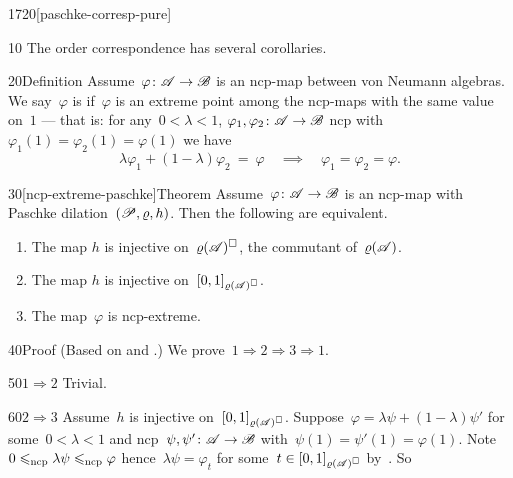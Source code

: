 \begin{parsec}{1720}[paschke-corresp-pure]%
\begin{point}{10}%
The order correspondence 
    has several corollaries.
\end{point}
\begin{point}{20}{Definition}%
Assume~$\varphi\colon \mathscr{A} \to \mathscr{B}$ is an ncp-map between von Neumann
    algebras.
We say~$\varphi$ is 
    if~$\varphi$ is an extreme point among
    the ncp-maps with the same value on~$1$ ---
    that is:
    for any~$0 < \lambda < 1$, $\varphi_1,\varphi_2\colon \mathscr{A} \to \mathscr{B}$
    ncp with~$\varphi_1(1) = \varphi_2(1) = \varphi(1)$
    we have
    \begin{equation*}
    \lambda \varphi_1 + (1-\lambda)\varphi_2 \ =\  \varphi
    \quad \implies \quad
    \varphi_1=\varphi_2=\varphi.
    \end{equation*}
\end{point}
\begin{point}{30}[ncp-extreme-paschke]{Theorem}%
Assume~$\varphi\colon \mathscr{A} \to \mathscr{B}$ is an ncp-map
    with Paschke dilation~$(\mathscr{P}, \varrho, h)$.
Then the following are equivalent.
\begin{enumerate}
    \item The map $h$ is injective on~$\varrho(\mathscr{A})^\square$,
                the commutant of~$\varrho(\mathscr{A})$.
    \item The map $h$ is injective on~$[0,1]_{\varrho(\mathscr{A})^\square}$.
    \item The map~$\varphi$ is ncp-extreme.
\end{enumerate}
\begin{point}{40}{Proof}%
(Based on \cite[Prop.~1.4.6]{arveson}
    and \cite[Thm.~5.4]{paschke}.)
We prove~$1 \Rightarrow 2 \Rightarrow 3 \Rightarrow 1$.
\begin{point}{50}{$1 \Rightarrow 2$}%
Trivial.
\end{point}
\begin{point}{60}{$2 \Rightarrow 3$}%
Assume~$h$ is injective on~$[0,1]_{\varrho(\mathscr{A})^\square}$.
Suppose~$\varphi = \lambda \psi + (1 - \lambda) \psi'$
    for some~$0 < \lambda < 1$
    and ncp~$\psi,\psi'\colon \mathscr{A} \to \mathscr{B}$
    with~$\psi(1) = \psi'(1) = \varphi(1)$.
Note~$0 \leqslant_{\mathrm{ncp}} \lambda\psi \leqslant_{\mathrm{ncp}} \varphi$
hence~$\lambda\psi = \varphi_t$ for some~$t \in [0,1]_{\varrho(\mathscr{A})^\square}$
by~.
So
\begin{equation*}

\end{equation*}
\end{point}
\end{point}
\end{point}
\end{parsec}
